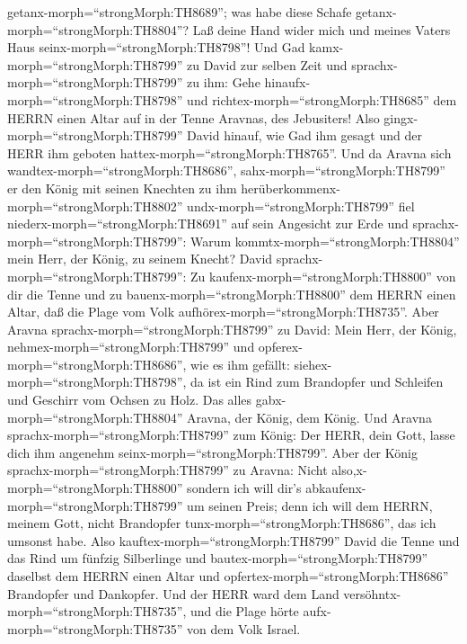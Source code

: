getanx-morph=``strongMorph:TH8689''; was habe diese Schafe
getanx-morph=``strongMorph:TH8804''? Laß deine Hand wider mich und
meines Vaters Haus seinx-morph=``strongMorph:TH8798''!  Und
Gad kamx-morph=``strongMorph:TH8799'' zu David zur selben Zeit und
sprachx-morph=``strongMorph:TH8799'' zu ihm: Gehe
hinaufx-morph=``strongMorph:TH8798'' und
richtex-morph=``strongMorph:TH8685'' dem HERRN einen Altar auf in der
Tenne Aravnas, des Jebusiters!  Also
gingx-morph=``strongMorph:TH8799'' David hinauf, wie Gad ihm gesagt und
der HERR ihm geboten hattex-morph=``strongMorph:TH8765''. 
Und da Aravna sich wandtex-morph=``strongMorph:TH8686'',
sahx-morph=``strongMorph:TH8799'' er den König mit seinen Knechten zu
ihm herüberkommenx-morph=``strongMorph:TH8802''
undx-morph=``strongMorph:TH8799'' fiel
niederx-morph=``strongMorph:TH8691'' auf sein Angesicht zur Erde
 und sprachx-morph=``strongMorph:TH8799'': Warum
kommtx-morph=``strongMorph:TH8804'' mein Herr, der König, zu seinem
Knecht? David sprachx-morph=``strongMorph:TH8799'': Zu
kaufenx-morph=``strongMorph:TH8800'' von dir die Tenne und zu
bauenx-morph=``strongMorph:TH8800'' dem HERRN einen Altar, daß die Plage
vom Volk aufhörex-morph=``strongMorph:TH8735''.  Aber
Aravna sprachx-morph=``strongMorph:TH8799'' zu David: Mein Herr, der
König, nehmex-morph=``strongMorph:TH8799'' und
opferex-morph=``strongMorph:TH8686'', wie es ihm gefällt:
siehex-morph=``strongMorph:TH8798'', da ist ein Rind zum Brandopfer und
Schleifen und Geschirr vom Ochsen zu Holz.  Das alles
gabx-morph=``strongMorph:TH8804'' Aravna, der König, dem König. Und
Aravna sprachx-morph=``strongMorph:TH8799'' zum König: Der HERR, dein
Gott, lasse dich ihm angenehm seinx-morph=``strongMorph:TH8799''.
 Aber der König sprachx-morph=``strongMorph:TH8799'' zu
Aravna: Nicht also,x-morph=``strongMorph:TH8800'' sondern ich will dir's
abkaufenx-morph=``strongMorph:TH8799'' um seinen Preis; denn ich will
dem HERRN, meinem Gott, nicht Brandopfer
tunx-morph=``strongMorph:TH8686'', das ich umsonst habe. Also
kauftex-morph=``strongMorph:TH8799'' David die Tenne und das Rind um
fünfzig Silberlinge  und
bautex-morph=``strongMorph:TH8799'' daselbst dem HERRN einen Altar und
opfertex-morph=``strongMorph:TH8686'' Brandopfer und Dankopfer. Und der
HERR ward dem Land versöhntx-morph=``strongMorph:TH8735'', und die Plage
hörte aufx-morph=``strongMorph:TH8735'' von dem Volk Israel.
